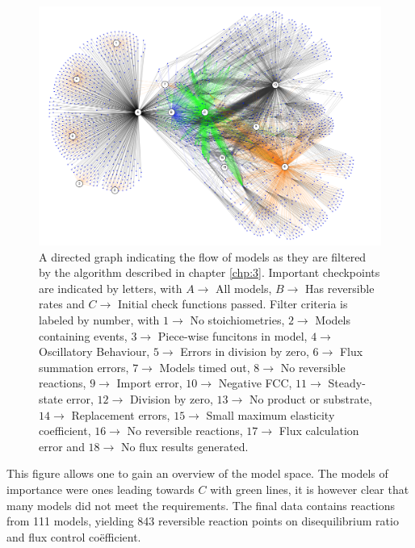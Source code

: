 \begin{figure}[p] 
\includegraphics[width=1\textwidth]{figs/Digraph.png}
\centering
\caption{A directed graph indicating the flow of models as they are filtered by the algorithm described in chapter \ref{chp:3}. 
Important checkpoints are indicated by letters, with $A \rightarrow{}$ All models, $B \rightarrow{}$ Has reversible rates and $C \rightarrow{}$ Initial check functions passed. Filter criteria is labeled by number, with $1 \rightarrow{}$ No stoichiometries, $2 \rightarrow{}$ Models containing events, $3 \rightarrow{}$ Piece-wise funcitons in model, $4 \rightarrow{}$ Oscillatory Behaviour, $5 \rightarrow{}$ Errors in division by zero, $6 \rightarrow{}$ Flux summation errors, $7 \rightarrow{}$ Models timed out, $8 \rightarrow{}$ No reversible reactions, $9 \rightarrow{}$ Import error, $10 \rightarrow{}$ Negative FCC, $11 \rightarrow{}$ Steady-state error, $12 \rightarrow{}$ Division by zero, $13 \rightarrow{}$ No product or substrate, $14 \rightarrow{}$ Replacement errors, $15 \rightarrow{}$ Small maximum elasticity coefficient, $16 \rightarrow{}$ No reversible reactions, $17 \rightarrow{}$ Flux calculation error and $18 \rightarrow{}$ No flux results generated.}
\label{Graph_modDistro}
\end{figure}

This figure allows one to gain an overview of the model space. The models of importance were ones leading towards $C$ with green lines, it is however clear that many models did not meet the requirements. The final data contains reactions from 111 models, yielding 843 reversible reaction points on disequilibrium ratio and flux control co\"efficient.

